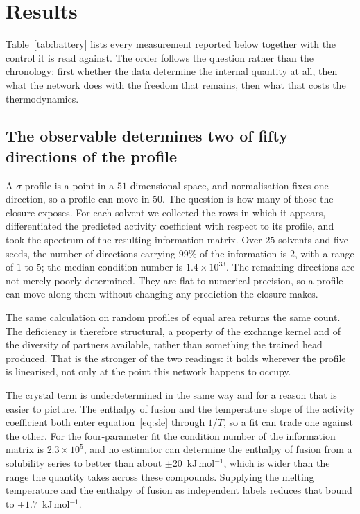 \section{Results}
\label{sec:results}

Table~\ref{tab:battery} lists every measurement reported below together with the control it is read
against. The order follows the question rather than the chronology: first whether the data
determine the internal quantity at all, then what the network does with the freedom that remains,
then what that costs the thermodynamics.

\subsection{The observable determines two of fifty directions of the profile}
\label{sec:determined}

A $\sigma$-profile is a point in a $51$-dimensional space, and normalisation fixes one direction, so
a profile can move in $50$. The question is how many of those the closure exposes. For each
solvent we collected the rows in which it appears, differentiated the predicted activity
coefficient with respect to its profile, and took the spectrum of the resulting information matrix.
Over $25$ solvents and five seeds, the number of directions carrying $99\%$ of the information is
$2$, with a range of $1$ to $5$; the median condition number is $1.4\times10^{33}$. The remaining
directions are not merely poorly determined. They are flat to numerical precision, so a profile can
move along them without changing any prediction the closure makes.

The same calculation on random profiles of equal area returns the same count. The deficiency is
therefore structural, a property of the exchange kernel and of the diversity of partners available,
rather than something the trained head produced. That is the stronger of the two readings: it holds
wherever the profile is linearised, not only at the point this network happens to occupy.

The crystal term is underdetermined in the same way and for a reason that is easier to picture. The
enthalpy of fusion and the temperature slope of the activity coefficient both enter
equation~\eqref{eq:sle} through $1/T$, so a fit can trade one against the other. For the
four-parameter fit the condition number of the information matrix is $2.3\times10^{5}$, and no
estimator can determine the enthalpy of fusion from a solubility series to better than about
$\pm20$~kJ\,mol$^{-1}$, which is wider than the range the quantity takes across these compounds.
Supplying the melting temperature and the enthalpy of fusion as independent labels reduces that
bound to $\pm1.7$~kJ\,mol$^{-1}$.


